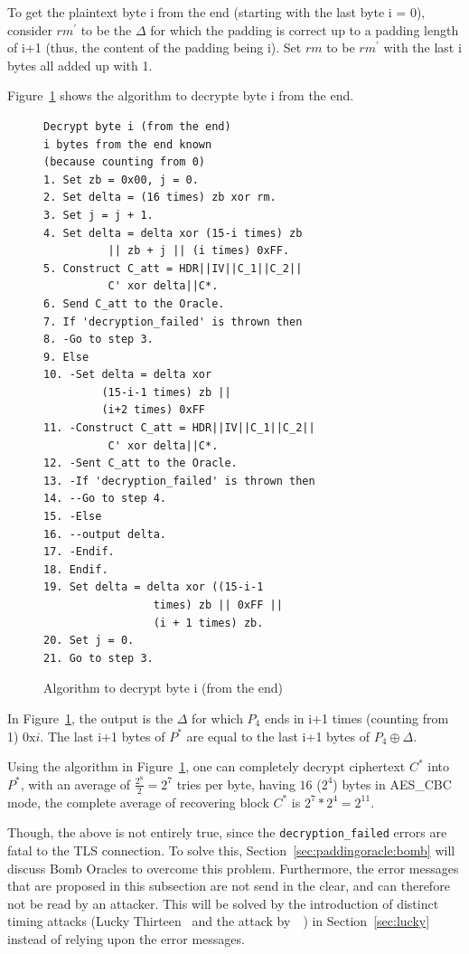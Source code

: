 \documentclass[10pt,conference,a4paper]{IEEEtran}
\begin{document}
To get the plaintext byte i from the end (starting with the last byte i = 0), consider $rm^{'}$ to be the $\Delta$ for which the padding is correct up to a padding length of i+1 (thus, the content of the padding being i). Set $rm$ to be $rm^{'}$ with the last i bytes all added up with 1.

Figure~\ref{sec:paddingoracle:padding:bytei} shows the algorithm to decrypte byte i from the end.

\begin{figure}
\begin{verbatim}
Decrypt byte i (from the end)
i bytes from the end known
(because counting from 0)
1. Set zb = 0x00, j = 0.
2. Set delta = (16 times) zb xor rm.
3. Set j = j + 1.
4. Set delta = delta xor (15-i times) zb 
          || zb + j || (i times) 0xFF.
5. Construct C_att = HDR||IV||C_1||C_2||
          C' xor delta||C*.
6. Send C_att to the Oracle.
7. If 'decryption_failed' is thrown then
8. -Go to step 3.
9. Else
10. -Set delta = delta xor 
         (15-i-1 times) zb || 
         (i+2 times) 0xFF
11. -Construct C_att = HDR||IV||C_1||C_2||
          C' xor delta||C*.
12. -Sent C_att to the Oracle.
13. -If 'decryption_failed' is thrown then
14. --Go to step 4.
15. -Else
16. --output delta.
17. -Endif.
18. Endif.
19. Set delta = delta xor ((15-i-1 
                 times) zb || 0xFF || 
                 (i + 1 times) zb.
20. Set j = 0.
21. Go to step 3.
\end{verbatim}
\caption{Algorithm to decrypt byte i (from the end)}
\label{sec:paddingoracle:padding:bytei}
\end{figure}

In Figure~\ref{sec:paddingoracle:padding:bytei}, the output is the $\Delta$ for which $P_4$ ends in i+1 times (counting from 1) $0\text{x}i$. The last i+1 bytes of $P^{*}$ are equal to the last i+1 bytes of $P_4 \oplus \Delta$.

Using the algorithm in Figure~\ref{sec:paddingoracle:padding:bytei}, one can completely decrypt ciphertext $C^{*}$ into $P^{*}$, with an average of $\frac{2^8}{2} = 2^7$ tries per byte, having $16$ ($2^4$) bytes in AES\_CBC mode, the complete average of recovering block $C^{*}$ is $2^7 * 2^4 = 2^{11}$.

Though, the above is not entirely true, since the \texttt{decryption\_failed} errors are fatal to the TLS connection. To solve this, Section~\ref{sec:paddingoracle:bomb} will discuss Bomb Oracles to overcome this problem. Furthermore, the error messages that are proposed in this subsection are not send in the clear, and can therefore not be read by an attacker. This will be solved by the introduction of distinct timing attacks (Lucky Thirteen~\cite{alfardan2013lucky} and the attack by~\citeauthor{canvel2003password}~\cite{canvel2003password}) in Section~\ref{sec:lucky} instead of relying upon the error messages.
\end{document}
